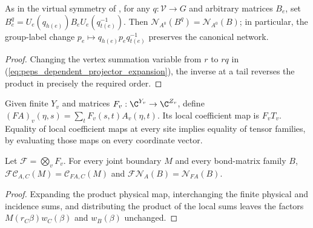 \begin{lemma}%
    \label{thm:peps_dependent_vertex_gauge}
    \leanok
    As in the virtual symmetry of \cite[Definition~5.1]{Schuch2010PEPS}, for
    any $q:\mathcal V\to G$ and arbitrary matrices $B_e$, set
    $B_e^q=U_e(q_{h(e)})B_eU_e(q_{t(e)}^{-1})$. Then
    $\mathcal N_{A^0}(B^q)=\mathcal N_{A^0}(B)$;
    in particular, the group-label change
    $p_e\mapsto q_{h(e)}p_eq_{t(e)}^{-1}$ preserves the canonical network.
\end{lemma}
\begin{proof}\leanok
    Changing the vertex summation variable from $r$ to $rq$ in
    (\ref{eq:peps_dependent_projector_expansion}), the inverse at a tail reverses
    the product in precisely the required order.
\end{proof}

\begin{definition}%
    \label{def:peps_dependent_physical_site}
    \leanok
    Given finite $Y_v$ and matrices $F_v:\C^{Y_v}\to\C^{Z_v}$, define
    $(FA)_v(\eta,s)=\sum_tF_v(s,t)A_v(\eta,t)$.
    Its local coefficient map is $F_vT_v$. Equality of local coefficient
    maps at every site implies equality of tensor families, by evaluating
    those maps on every coordinate vector.
\end{definition}

\begin{lemma}%
    \label{thm:peps_dependent_physical_contraction}
    \leanok
    Let $\mathcal F=\bigotimes_vF_v$. For every joint boundary $M$ and
    every bond-matrix family $B$,
    $\mathcal F\mathcal C_{A,C}(M)=\mathcal C_{FA,C}(M)$ and
    $\mathcal F\mathcal N_A(B)=\mathcal N_{FA}(B)$.
\end{lemma}
\begin{proof}\leanok
    Expanding the product physical map, interchanging the finite physical and
    incidence sums, and distributing the product of the local sums leaves
    the factors $M(r_C\beta)w_C(\beta)$ and $w_B(\beta)$ unchanged.
\end{proof}

